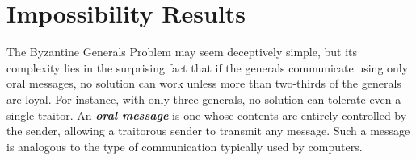 \documentclass[12pt]{article}
\theoremstyle{remark}
\begin{document}
\section*{\centering Impossibility Results}

The Byzantine Generals Problem may seem deceptively simple, but its complexity lies in the surprising fact that if the generals communicate using only oral messages, no solution can work unless more than two-thirds of the generals are loyal. For instance, with only three generals, no solution can tolerate even a single traitor. An \textbf{\emph{oral message}} is one whose contents are entirely controlled by the sender, allowing a traitorous sender to transmit any message. Such a message is analogous to the type of communication typically used by computers.

\vspace{2cm}
\end{document}
